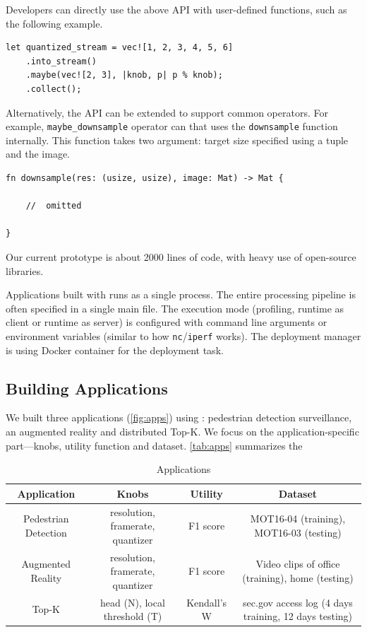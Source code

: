Developers can directly use the above API with user-defined functions, such as
the following example.

\begin{lstlisting}
let quantized_stream = vec![1, 2, 3, 4, 5, 6]
    .into_stream()
    .maybe(vec![2, 3], |knob, p| p % knob);
    .collect();
\end{lstlisting}

Alternatively, the API can be extended to support common operators. For example,
\texttt{maybe\_downsample} operator can that uses the \texttt{downsample}
function internally. This function takes two argument: target size specified
using a tuple and the image.

\begin{lstlisting}
fn downsample(res: (usize, usize), image: Mat) -> Mat {

    //  omitted

}
\end{lstlisting}

Our current prototype is about 2000 lines of code, with heavy use of open-source
libraries.

Applications built with \sysname{} runs as a single process. The entire
processing pipeline is often specified in a single main file. The execution mode
(profiling, runtime as client or runtime as server) is configured with command
line arguments or environment variables (similar to how
\texttt{nc}/\texttt{iperf} works). The deployment manager is using Docker
container for the deployment task.

\subsection{Building \sysname{} Applications}
\label{sec:build-appl}

We built three applications (\autoref{fig:apps}) using \sysname{}: pedestrian
detection surveillance, an augmented reality and distributed Top-K. We focus on
the application-specific part---knobs, utility function and
dataset. \autoref{tab:apps} summarizes the 

\begin{table}
  \centering
  \begin{tabular}{|c|c|c|c|}
    \hline
    Application & Knobs & Utility & Dataset \\
    \hline
    Pedestrian Detection & resolution, framerate, quantizer
                        & F1 score & MOT16-04 (training), MOT16-03 (testing) \\
    \hline
    Augmented Reality & resolution, framerate, quantizer
                        & F1 score & Video clips of office (training), home (testing) \\
    \hline
    Top-K & head (N), local threshold (T) & Kendall's W & sec.gov access log
                                                          (4 days training, 12 days testing)  \\
    \hline
  \end{tabular}
  \caption{\sysname{} Applications}
  \label{tab:apps}
\end{table}

